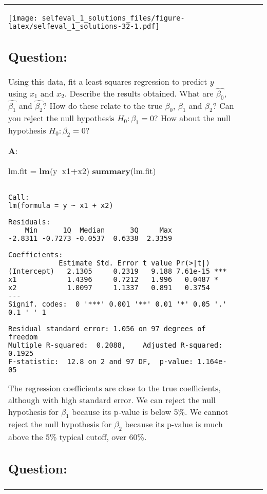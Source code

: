 \documentclass[12pt,]{article}
\newenvironment{Shaded}{\begin{snugshade}}{\end{snugshade}}
\newcommand{\KeywordTok}[1]{\textcolor[rgb]{0.13,0.29,0.53}{\textbf{#1}}}
\newcommand{\NormalTok}[1]{#1}
\newcommand{\OperatorTok}[1]{\textcolor[rgb]{0.81,0.36,0.00}{\textbf{#1}}}
\newcommand{\StringTok}[1]{\textcolor[rgb]{0.31,0.60,0.02}{#1}}
\begin{document}
\begin{tabularx}{0.5\textwidth}{p{} p{} p{} p{}}
\texttt{[image: selfeval\_1\_solutions\_files/figure-latex/selfeval\_1\_solutions-32-1.pdf]}

\hypertarget{question-20}{%
\subsection{Question:}\label{question-20}}

Using this data, fit a least squares regression to predict \(y\) using
\(x_1\) and \(x_2\). Describe the results obtained. What are
\(\hat{\beta_0}\), \(\hat{\beta_1}\) and \(\hat{\beta_2}\)? How do these
relate to the true \(\beta_0\), \(\beta_1\) and \(\beta_2\)? Can you
reject the null hypothesis \(H_0: \beta_1 =0\)? How about the null
hypothesis \(H_0: \beta_2 =0\)?

\textbf{A}:

\begin{Shaded}
\begin{Highlighting}[]
\NormalTok{lm.fit =}\StringTok{ }\KeywordTok{lm}\NormalTok{(y}\OperatorTok{~}\NormalTok{x1}\OperatorTok{+}\NormalTok{x2)}
\KeywordTok{summary}\NormalTok{(lm.fit)}
\end{Highlighting}
\end{Shaded}

\begin{verbatim}

Call:
lm(formula = y ~ x1 + x2)

Residuals:
    Min      1Q  Median      3Q     Max 
-2.8311 -0.7273 -0.0537  0.6338  2.3359 

Coefficients:
            Estimate Std. Error t value Pr(>|t|)    
(Intercept)   2.1305     0.2319   9.188 7.61e-15 ***
x1            1.4396     0.7212   1.996   0.0487 *  
x2            1.0097     1.1337   0.891   0.3754    
---
Signif. codes:  0 '***' 0.001 '**' 0.01 '*' 0.05 '.' 0.1 ' ' 1

Residual standard error: 1.056 on 97 degrees of freedom
Multiple R-squared:  0.2088,    Adjusted R-squared:  0.1925 
F-statistic:  12.8 on 2 and 97 DF,  p-value: 1.164e-05
\end{verbatim}

The regression coefficients are close to the true coefficients, although
with high standard error. We can reject the null hypothesis for
\(\beta_1\) because its p-value is below 5\%. We cannot reject the null
hypothesis for \(\beta_2\) because its p-value is much above the 5\%
typical cutoff, over 60\%.

\hypertarget{question-21}{%
\subsection{Question:}\label{question-21}}


\end{tabularx}
\end{document}
